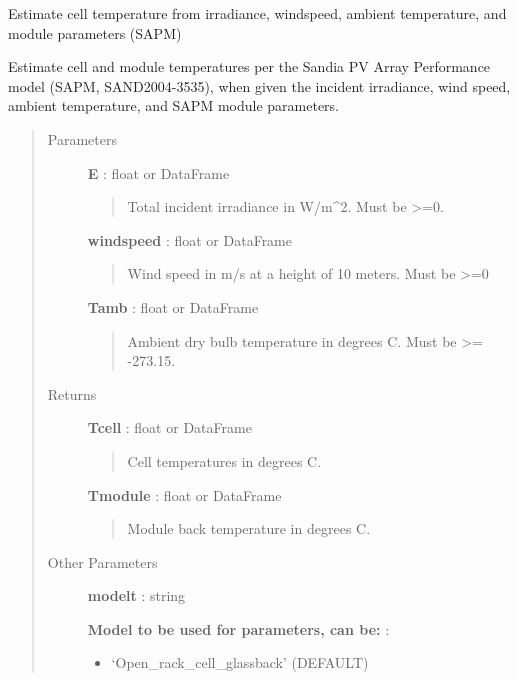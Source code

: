 \documentclass[letterpaper,10pt,english]{sphinxmanual}
\begin{document}
\begin{fulllineitems}
\label{stubs/pvlib.pvl_sapmcelltemp:pvlib.pvl_sapmcelltemp}
Estimate cell temperature from irradiance, windspeed, ambient temperature, and module parameters (SAPM)

Estimate cell and module temperatures per the Sandia PV Array
Performance model (SAPM, SAND2004-3535), when given the incident
irradiance, wind speed, ambient temperature, and SAPM module
parameters.
\begin{quote}\begin{description}
\item[{Parameters}] \leavevmode
\textbf{E} : float or DataFrame
\begin{quote}

Total incident irradiance in W/m\textasciicircum{}2. Must be \textgreater{}=0.
\end{quote}

\textbf{windspeed} : float or DataFrame
\begin{quote}

Wind speed in m/s at a height of 10 meters. Must be \textgreater{}=0
\end{quote}

\textbf{Tamb} : float or DataFrame
\begin{quote}

Ambient dry bulb temperature in degrees C. Must be \textgreater{}= -273.15.
\end{quote}

\item[{Returns}] \leavevmode
\textbf{Tcell} : float or DataFrame
\begin{quote}

Cell temperatures in degrees C.
\end{quote}

\textbf{Tmodule} : float or DataFrame
\begin{quote}

Module back temperature in degrees C.
\end{quote}

\item[{Other Parameters}] \leavevmode
\textbf{modelt} :  string

\textbf{Model to be used for parameters, can be:} :
\begin{itemize}
\item {} 
`Open\_rack\_cell\_glassback' (DEFAULT)


\end{itemize}
\end{description}
\end{quote}
\end{fulllineitems}
\end{document}
